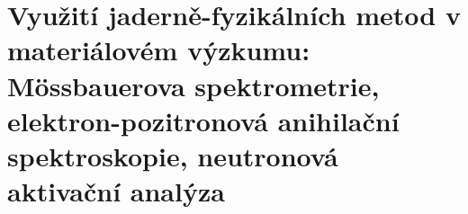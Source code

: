 \section[Využití jaderně-fyzikálních metod v materiálovém výzkumu]{Využití jaderně-fyzikálních metod v materiálovém výzkumu: Mössbauerova spektrometrie, elektron-pozitronová anihilační spektroskopie, neutronová aktivační analýza}

